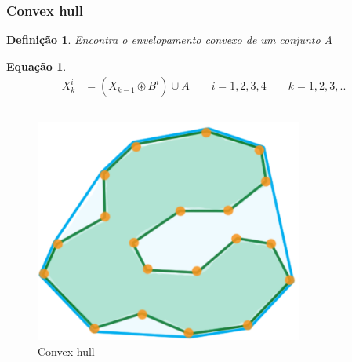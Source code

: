 \documentclass[aspectratio=169]{beamer}
\theoremstyle{Definition}
\newtheorem{defn}{Defini\c c\~ao}
\newtheorem{eq}[theorem]{Equa\c c\~ao}
\begin{document}
\begin{frame}
	\frametitle{Convex hull}
	
	\begin{defn}
		Encontra o envelopamento convexo de um conjunto A
	\end{defn}
	
	\begin{eq}
	
		\begin{align*}
			X^i_k& = ( X_{k-1} \circledast B^i) \cup A \qquad i = 1, 2, 3, 4 \qquad k = 1, 2, 3,..
		\end{align*}

	\end{eq}
	
	\begin{columns}
		\begin{column}{0.5\textwidth}
			\begin{figure}[h]
	  		 	\includegraphics[height=0.15\paperheight]{imagens/convex_hull}
				\caption{Convex hull}\label{figLogical}
			\end{figure}
		\end{column}
		\begin{column}{0.5\textwidth}
			\begin{figure}[h]

\end{figure}
\end{column}
\end{columns}
\end{frame}
\end{document}
